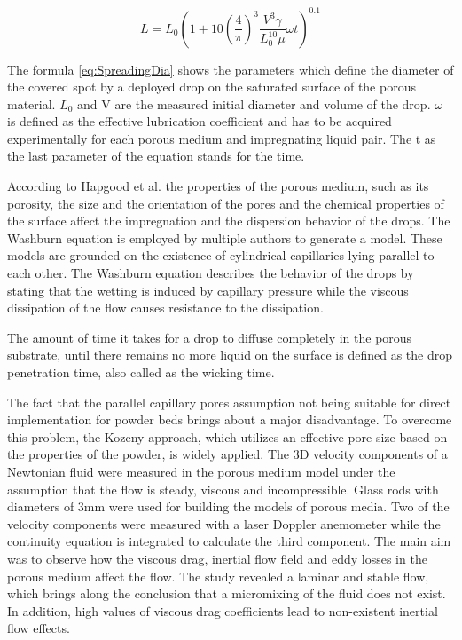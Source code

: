 \bigskip

\begin{equation} \label{eq:SpreadingDia}
L=L_0 (1+10(\frac{4}{\pi})^3 \frac{V^3 \gamma}{L_0^{10} \mu}\omega t)^{0.1}
\end{equation}

\bigskip

The formula \ref{eq:SpreadingDia} shows the parameters which define the diameter of the covered spot by a deployed drop on the saturated surface of the porous material. $L_0$ and V are the measured initial diameter and volume of the drop. $\omega$ is defined as the effective lubrication coefficient and has to be acquired experimentally for each porous medium and impregnating liquid pair. The t as the last parameter of the equation stands for the time. 

According to Hapgood et al. the properties of the porous medium, such as its porosity, the size and the orientation of the pores and the chemical properties of the surface affect the impregnation and the dispersion behavior of the drops. The Washburn equation is employed by multiple authors to generate a model. These models are grounded on the existence of cylindrical capillaries lying parallel to each other. The Washburn equation describes the behavior of the drops by stating that the wetting is induced by capillary pressure while the viscous dissipation of the flow causes resistance to the dissipation.

The amount of time it takes for a drop to diffuse completely in the porous substrate, until there remains no more liquid on the surface is defined as the drop penetration time, also called as the wicking time.

The fact that the parallel capillary pores assumption not being suitable for direct implementation for powder beds brings about a major disadvantage. To overcome this problem, the Kozeny approach, which utilizes an effective pore size based on the properties of the powder, is widely applied. The 3D velocity components of a Newtonian fluid were measured in the porous medium model under the assumption that the flow is steady, viscous and incompressible. Glass rods with diameters of 3mm were used for building the models of porous media. Two of the velocity components were measured with a laser Doppler anemometer while the  continuity equation is integrated to calculate the third component. The main aim was to observe how the viscous drag, inertial flow field and eddy losses in the porous medium affect the flow. The study revealed a laminar and stable  flow, which brings along the conclusion  that a micromixing of the fluid does not exist. In addition, high values of viscous drag coefficients lead to non-existent inertial flow effects.

